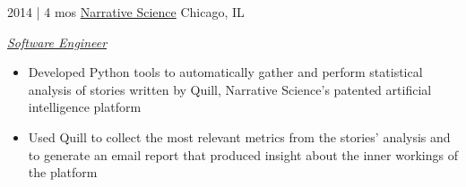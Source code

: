 \begin{entrylist}

\entry
{2014 | 4 mos}
{\href{https://narrativescience.com/}{Narrative Science}}
{Chicago, IL}
{\textit{\underline{Software Engineer}}\\
\begin{itemize}
\item Developed Python tools to automatically gather and perform statistical analysis of stories written by Quill, Narrative Science's patented artificial intelligence platform
\item Used Quill to collect the most relevant metrics from the stories' analysis and to generate an email report that produced insight about the inner workings of the platform
\end{itemize}}


\end{entrylist}

